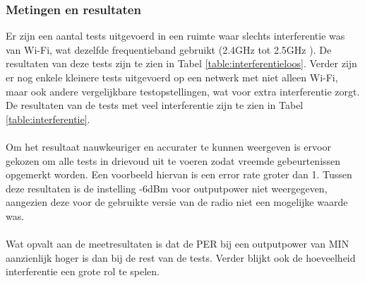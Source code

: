 \documentclass{article}
\begin{document}
\subsubsection{Metingen en resultaten}
\label{results}
Er zijn een aantal tests uitgevoerd in een ruimte waar slechts interferentie was van Wi-Fi, wat dezelfde frequentieband gebruikt (2.4GHz tot 2.5GHz \cite{wifi}). De resultaten van deze tests zijn te zien in Tabel \ref{table:interferentieloos}. Verder zijn er nog enkele kleinere tests uitgevoerd op een netwerk met niet alleen Wi-Fi, maar ook andere vergelijkbare testopstellingen, wat voor extra interferentie zorgt. De resultaten van de tests met veel interferentie zijn te zien in Tabel \ref{table:interferentie}. \\
\\
Om het resultaat nauwkeuriger en accurater te kunnen weergeven is ervoor gekozen om alle tests in drievoud uit te voeren zodat vreemde gebeurtenissen opgemerkt worden. Een voorbeeld hiervan is een error rate groter dan 1. Tussen deze resultaten is de instelling -6dBm voor outputpower niet weergegeven, aangezien deze voor de gebruikte versie van de radio niet een mogelijke waarde was.\\
\\
Wat opvalt aan de meetresultaten is dat de PER bij een outputpower van MIN aanzienlijk hoger is dan bij de rest van de tests. Verder blijkt ook de hoeveelheid interferentie een grote rol te spelen. 
\end{document}
